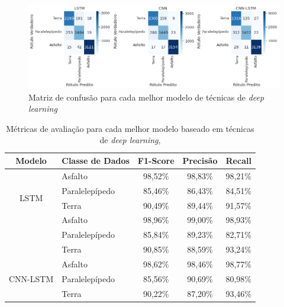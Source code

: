 \begin{figure}[H]
  \centering
  \caption{Matriz de confusão para cada melhor modelo de técnicas de \textit{deep learning}}
  \label{fig:confusion_matrix_deep_tipo_superficie_1}
  \includegraphics[width=1\textwidth]{figuras/fig_35.png}
\end{figure}

\begin{table}[H]
\scriptsize
\centering
\caption{Métricas de avaliação para cada melhor modelo baseado em técnicas de \textit{deep learning},} 
\label{table:deep_ml_metrics_tipo_superficie_1}
\begin{tabular}{clccc}
\toprule
\textbf{Modelo} & \multicolumn{1}{c}{\textbf{Classe de Dados}} & \textbf{F1-Score} & \textbf{Precisão} & \textbf{Recall} \\ \midrule
\multirow{4}{*}{LSTM} & Asfalto & 98,52\% & 98,83\% & 98,21\% \\ \cmidrule(l){2-5} 
 & Paralelepípedo & 85,46\% & 86,43\% & 84,51\% \\ \cmidrule(l){2-5} 
 & Terra & 90,49\% & 89,44\% & 91,57\% \\ \midrule
\multirow{4}{*}{CNN} & Asfalto & 98,96\% & 99,00\% & 98,93\% \\ \cmidrule(l){2-5} 
 & Paralelepípedo & 85,84\% & 89,23\% & 82,71\% \\ \cmidrule(l){2-5} 
 & Terra & 90,85\% & 88,59\% & 93,24\% \\ \midrule
\multirow{4}{*}{CNN-LSTM} & Asfalto & 98,62\% & 98,46\% & 98,77\% \\ \cmidrule(l){2-5} 
 & Paralelepípedo & 85,56\% & 90,69\% & 80,98\% \\ \cmidrule(l){2-5} 
 & Terra & 90,22\% & 87,20\% & 93,46\% \\ \bottomrule
\end{tabular}
\end{table}

